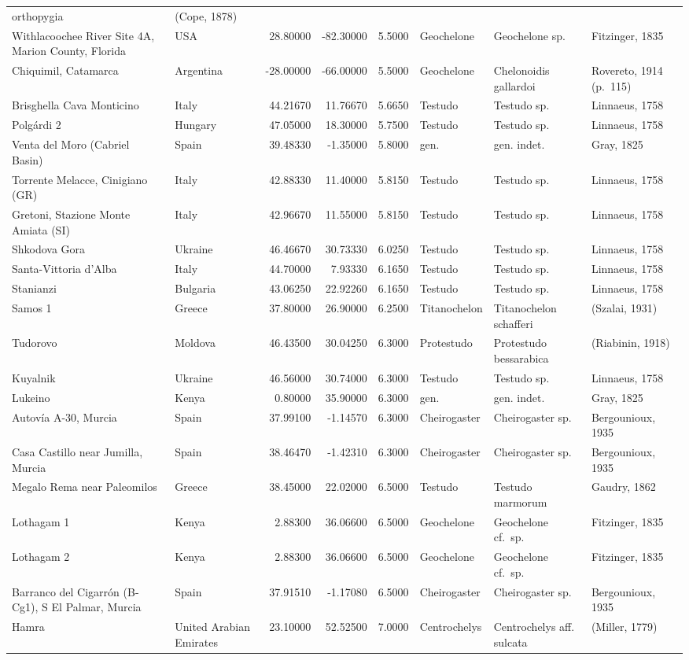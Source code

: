 \documentclass[]{article}
\begin{document}
\begin{longtable}[]{@{}llrrrlll@{}}
orthopygia & (Cope, 1878)\tabularnewline
Withlacoochee River Site 4A, Marion County, Florida & USA & 28.80000 &
-82.30000 & 5.5000 & Geochelone & Geochelone sp. & Fitzinger,
1835\tabularnewline
Chiquimil, Catamarca & Argentina & -28.00000 & -66.00000 & 5.5000 &
Geochelone & Chelonoidis gallardoi & Rovereto, 1914
(p.~115)\tabularnewline
Brisghella Cava Monticino & Italy & 44.21670 & 11.76670 & 5.6650 &
Testudo & Testudo sp. & Linnaeus, 1758\tabularnewline
Polgárdi 2 & Hungary & 47.05000 & 18.30000 & 5.7500 & Testudo & Testudo
sp. & Linnaeus, 1758\tabularnewline
Venta del Moro (Cabriel Basin) & Spain & 39.48330 & -1.35000 & 5.8000 &
gen. & gen. indet. & Gray, 1825\tabularnewline
Torrente Melacce, Cinigiano (GR) & Italy & 42.88330 & 11.40000 & 5.8150
& Testudo & Testudo sp. & Linnaeus, 1758\tabularnewline
Gretoni, Stazione Monte Amiata (SI) & Italy & 42.96670 & 11.55000 &
5.8150 & Testudo & Testudo sp. & Linnaeus, 1758\tabularnewline
Shkodova Gora & Ukraine & 46.46670 & 30.73330 & 6.0250 & Testudo &
Testudo sp. & Linnaeus, 1758\tabularnewline
Santa-Vittoria d'Alba & Italy & 44.70000 & 7.93330 & 6.1650 & Testudo &
Testudo sp. & Linnaeus, 1758\tabularnewline
Stanianzi & Bulgaria & 43.06250 & 22.92260 & 6.1650 & Testudo & Testudo
sp. & Linnaeus, 1758\tabularnewline
Samos 1 & Greece & 37.80000 & 26.90000 & 6.2500 & Titanochelon &
Titanochelon schafferi & (Szalai, 1931)\tabularnewline
Tudorovo & Moldova & 46.43500 & 30.04250 & 6.3000 & Protestudo &
Protestudo bessarabica & (Riabinin, 1918)\tabularnewline
Kuyalnik & Ukraine & 46.56000 & 30.74000 & 6.3000 & Testudo & Testudo
sp. & Linnaeus, 1758\tabularnewline
Lukeino & Kenya & 0.80000 & 35.90000 & 6.3000 & gen. & gen. indet. &
Gray, 1825\tabularnewline
Autovía A-30, Murcia & Spain & 37.99100 & -1.14570 & 6.3000 &
Cheirogaster & Cheirogaster sp. & Bergounioux, 1935\tabularnewline
Casa Castillo near Jumilla, Murcia & Spain & 38.46470 & -1.42310 &
6.3000 & Cheirogaster & Cheirogaster sp. & Bergounioux,
1935\tabularnewline
Megalo Rema near Paleomilos & Greece & 38.45000 & 22.02000 & 6.5000 &
Testudo & Testudo marmorum & Gaudry, 1862\tabularnewline
Lothagam 1 & Kenya & 2.88300 & 36.06600 & 6.5000 & Geochelone &
Geochelone cf.~sp. & Fitzinger, 1835\tabularnewline
Lothagam 2 & Kenya & 2.88300 & 36.06600 & 6.5000 & Geochelone &
Geochelone cf.~sp. & Fitzinger, 1835\tabularnewline
Barranco del Cigarrón (B-Cg1), S El Palmar, Murcia & Spain & 37.91510 &
-1.17080 & 6.5000 & Cheirogaster & Cheirogaster sp. & Bergounioux,
1935\tabularnewline
Hamra & United Arabian Emirates & 23.10000 & 52.52500 & 7.0000 &
Centrochelys & Centrochelys aff. sulcata & (Miller, 1779)\tabularnewline

\end{longtable}
\end{document}
